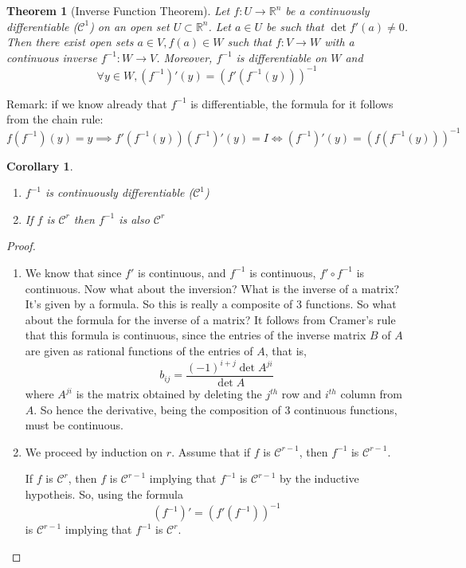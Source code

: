 \documentclass{article}
\newtheorem{theorem}{Theorem}
\newtheorem*{corollary}{Corollary}
\newcommand{\reals}[0]{\mathbb{R}}
\newcommand{\mc}[1]{\mathcal{#1}}
\begin{document}
\begin{theorem}[Inverse Function Theorem]
  Let \(f: U \to \reals^n\) be a continuously differentiable (\(\mc{C}^1\)) on an open set \(U \subset \reals^n\). Let \(a \in U\) be such that \(\det f'(a) \neq 0\). Then there exist open sets \(a \in V, f(a) \in W\) such that \(f: V \to W\) with a continuous inverse \(f^{-1}: W \to V\). Moreover, \(f^{-1}\) is differentiable on \(W\) and
  \begin{equation}\forall y \in W, (f^{-1})'(y) = (f'(f^{-1}(y)))^{-1}\end{equation}
\end{theorem}
Remark: if we know already that \(f^{-1}\) is differentiable, the formula for it follows from the chain rule:
\begin{equation}f(f^{-1})(y) = y \implies f'(f^{-1}(y))(f^{-1})'(y) = I \iff (f^{-1})'(y) = (f(f^{-1}(y)))^{-1}\end{equation}
\begin{corollary}
  \begin{enumerate}
    \item \(f^{-1}\) is continuously differentiable (\(\mc{C}^1\))
    \item If \(f\) is \(\mc{C}^r\) then \(f^{-1}\) is also \(\mc{C}^r\)
  \end{enumerate}
\end{corollary}
\begin{proof}
  \begin{enumerate}

    \item  We know that since \(f'\) is continuous, and \(f^{-1}\) is continuous, \(f' \circ f^{-1}\) is continuous. Now what about the inversion? What is the inverse of a matrix? It's given by a formula. So this is really a composite of 3 functions. So what about the formula for the inverse of a matrix? It follows from Cramer's rule that this formula is continuous, since the entries of the inverse matrix \(B\) of \(A\) are given as rational functions of the entries of \(A\), that is,
    \begin{equation}b_{ij} = \frac{(-1)^{i + j}\det A^{ji}}{\det A}\end{equation}
    where \(A^{ji}\) is the matrix obtained by deleting the \(j^{th}\) row and \(i^{th}\) column from \(A\). So hence the derivative, being the composition of 3 continuous functions, must be continuous.

    \item We proceed by induction on \(r\). Assume that if \(f\) is \(\mc{C}^{r - 1}\), then \(f^{-1}\) is \(\mc{C}^{r - 1}\).

    If \(f\) is \(\mc{C}^r\), then \(f\) is \(\mc{C}^{r - 1}\) implying that \(f^{-1}\) is \(\mc{C}^{r - 1}\) by the inductive hypotheis. So, using the formula
    \begin{equation}(f^{-1})' = (f'(f^{-1}))^{-1}\end{equation}
    is \(\mc{C}^{r - 1}\) implying that \(f^{-1}\) is \(\mc{C}^r\).

  \end{enumerate}
\end{proof}
\end{document}
